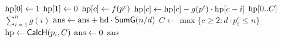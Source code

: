 \begin{algorithm}[H]
    \caption{PN 筛}
    \begin{algorithmic}[1]
            \State $\pvar{hp}[0] \gets 1$
            \State $\pvar{hp}[1] \gets 0$
                \State $\pvar{hp}[c] \gets f(p^c)$
                    \State $\pvar{hp}[c] \gets \pvar{hp}[c]-g(p^i)\cdot \pvar{hp}[c-i]$
                \EndFor
            \EndFor
            \State \Return $\pvar{hp}[0..C]$
        \EndProcedure
            \State \Return $\sum_{i=1}^{n}g(i)$
        \EndProcedure
            \State $\pvar{ans} \gets \pvar{ans} + \pvar{hd} \cdot \Call{SumG}{n/d}$
                \State $C \gets \max\{c \ge 2 : d\cdot p_i^c \le n\}$
                \State $\pvar{hp} \gets \Call{CalcH}{p_i, C}$
                    \State {}
                \EndFor
            \EndFor
        \EndProcedure
            \State $\pvar{ans} \gets 0$
            \State {}
            \State \Return $\pvar{ans}$
        \EndProcedure
    \end{algorithmic}
\end{algorithm}
